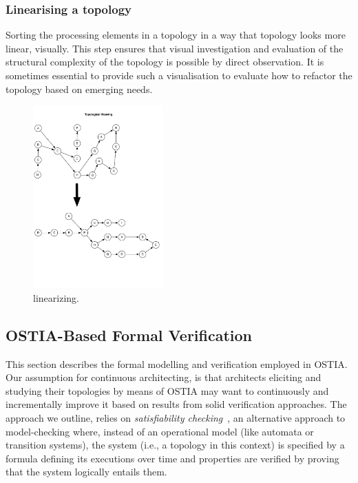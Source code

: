 \subsubsection{Linearising a topology}

Sorting the processing elements in a topology in a way that topology looks more linear, visually. This step ensures that visual investigation and evaluation of the structural complexity of the topology is possible by direct observation. It is sometimes essential to provide such a visualisation to evaluate how to refactor the topology based on emerging needs.

\begin{figure}[H]
	\begin{center}
		\includegraphics[width=5cm]{images/linearizing}
		\caption{linearizing.}
		\label{fig:linearizing}
	\end{center}
\end{figure}



\subsection{OSTIA-Based Formal Verification}\label{ver}


This section describes the formal modelling and verification employed in OSTIA. Our assumption for continuous architecting, is that architects eliciting and studying their topologies by means of OSTIA may want to continuously and incrementally improve it based on results from solid verification approaches. The approach we outline, relies on \textit{satisfiability checking}~\cite{MPS13}, an alternative approach to model-checking where, instead of an operational model (like automata or transition systems), the system (i.e., a topology in this context) is specified by a formula defining its executions over time and properties are verified by proving that the system logically entails them.

